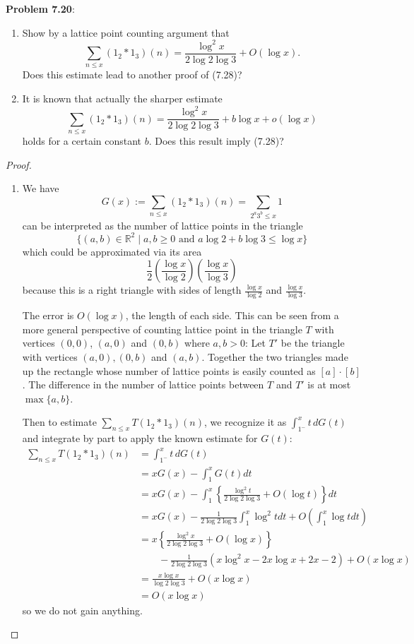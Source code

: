 \documentclass[12pt]{article}
\newcommand{\R}{\mathbb{R}}
\begin{document}
\textbf{Problem 7.20}: \begin{enumerate}
\item Show by a lattice point counting argument that
$$\sum_{n \leq x} (1_2 * 1_3)(n) = \frac{\log^2 x}{2 \log 2 \log 3} + O(\log x).$$
Does this estimate lead to another proof of (7.28)?
\item It is known that actually the sharper estimate
$$\sum_{n \leq x} (1_2 * 1_3)(n) = \frac{\log^2 x}{2 \log 2 \log 3} + b \log x + o(\log x)$$
holds for a certain constant $b$. Does this result imply (7.28)?
\end{enumerate}

\begin{proof}
\begin{enumerate}
\item We have
$$G(x) := \sum_{n \leq x} (1_2 * 1_3)(n) = \sum_{2^a 3^b \leq x} 1$$
can be interpreted as the number of lattice points in the triangle
$$\{(a, b) \in \R^2 \;|\; a, b \geq 0 \text{ and } a \log 2 + b \log 3 \leq \log x\}$$
which could be approximated via its area
$$\frac{1}{2} \left(\frac{\log x}{\log 2}\right) \left(\frac{\log x}{\log 3}\right)$$
because this is a right triangle with sides of length $\frac{\log x}{\log 2}$ and $\frac{\log x}{\log 3}$.

The error is $O(\log x)$, the length of each side. This can be seen from a more general perspective of counting lattice point in the triangle $T$ with vertices $(0, 0)$, $(a, 0)$ and $(0, b)$ where $a, b > 0$: Let $T'$ be the triangle with vertices $(a, 0), (0, b)$ and $(a, b)$. Together the two triangles made up the rectangle whose number of lattice points is easily counted as $[a] \cdot [b]$. The difference in the number of lattice points between $T$ and $T'$ is at most $\max\{a, b\}$.

Then to estimate $\sum_{n \leq x} T(1_2 * 1_3)(n)$, we recognize it as $\int_{1^-}^x t \, dG(t)$ and integrate by part to apply the known estimate for $G(t)$:
\begin{align*}
\sum_{n \leq x} T(1_2 * 1_3)(n) &= \int_{1^-}^x t \, dG(t) \\
&= x G(x) - \int_1^x G(t) dt \\
&= x G(x) - \int_1^x \left\{ \frac{\log^2 t}{2 \log 2 \log 3} + O(\log t) \right\} dt \\
&= x G(x) - \frac{1}{2 \log 2 \log 3} \int_1^x \log^2 t dt + O(\int_1^x \log t dt )\\
&= x \left\{ \frac{\log^2 x}{2 \log 2 \log 3} + O(\log x) \right\} \\
&\qquad - \frac{1}{2 \log 2 \log 3} ( x \log^2 x - 2 x \log x + 2 x - 2) + O(x \log x)\\
&= \frac{x \log x}{\log 2 \log 3} + O(x \log x)\\
&= O(x \log x)
\end{align*}
so we do not gain anything.


\end{enumerate}
\end{proof}
\end{document}
